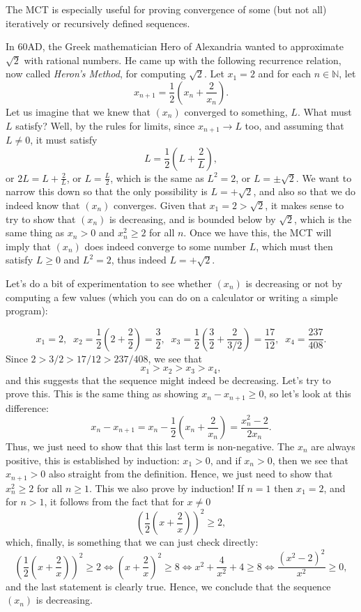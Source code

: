 \documentclass[11pt,dvipsnames]{book}
\numberwithin{figure}{section} %
\numberwithin{table}{section} %
\begin{document}
The MCT is especially useful for proving convergence of some (but not all) iteratively or recursively defined sequences.
\begin{example}
In 60AD, the Greek mathematician Hero of Alexandria wanted to approximate $\sqrt{2}$ with rational numbers. %
He came up with the following recurrence relation, now called {\it Heron's Method}, for computing $\sqrt{2}$. Let $x_{1}=2$ and for each $n\in\mathbb{N}$, let
\[
x_{n+1}=\frac{1}{2}\left(x_{n}+\frac{2}{x_{n}}\right).
\]
Let us imagine that we knew that $(x_n)$ converged to something, $L$. What must $L$ satisfy? Well, by the rules for limits, since $x_{n+1} \to L$ too, and assuming that $L \neq 0$, it must satisfy
\[
L=\frac{1}{2}\left(L+\frac{2}{L}\right),
\]
or $2L =L + \frac{2}{L}$, or $L = \frac{L}{2}$, which is the same as $L^2 = 2$, or $L = \pm\sqrt{2}$. We want to narrow this down so that the only possibility is $L = + \sqrt{2}$, and also so that we do indeed know that $(x_n)$ converges. Given that $x_1 = 2 > \sqrt{2}$, it makes sense to try to show that $(x_n)$ is decreasing, and is bounded below by $\sqrt{2}$, which is the same thing as $x_n > 0$ and $x_n^2 \geq 2$ for all $n$. Once we have this, the MCT will imply that $(x_n)$ does indeed converge to some number $L$, which must then satisfy $L \geq 0$ and $L^2 = 2$, thus indeed $L = + \sqrt{2}$.

Let's do a bit of experimentation to see whether $(x_n)$ is decreasing or not by computing a few values (which you can do on a calculator or writing a simple program):

\[
x_{1}=2,\;\; x_{2} = \frac{1}{2}\left(2+\frac{2}{2}\right) = \frac{3}{2}, \;\; x_{3}=\frac{1}{2}\left(\frac{3}{2}+\frac{2}{3/2}\right) = \frac{17}{12}, \;\; x_{4} = \frac{237}{408}.
\]
Since $ 2 > 3/2 > 17/12 > 237/408$, we see that
\[ x_1 > x_2 > x_3 > x_4, \]
and this suggests that the sequence might indeed be decreasing. Let's try to prove this.
This is the same thing as showing $x_{n}-x_{n+1}\geq 0$, so let's look at this difference:
\[
x_{n}-x_{n+1}=x_{n}-\frac{1}{2}\left(x_{n}+\frac{2}{x_{n}}\right) =\frac{x_{n}^{2}-2}{2x_{n}}.
\]
Thus, we just need to show that this last term is non-negative. The $x_{n}$ are always positive, this is established by induction: $x_1>0$, and if $x_n>0$, then we see that $x_{n+1}>0$ also straight from the definition. Hence, we just need to show that $x_{n}^{2}\geq 2$ for all $n\geq 1$. This we also prove by induction! If $n=1$ then $x_{1}=2$, and for $n>1$, it follows from the fact that for $x \neq 0$
\[
\left(\frac{1}{2}\left(x+\frac{2}{x}\right)\right)^2 \geq 2,
\]
which, finally, is something that we can just check directly:
\[
\left(\frac{1}{2}\left(x+\frac{2}{x}\right)\right)^2 \geq 2 \iff \left(x+\frac{2}{x}\right)^2 \geq 8 \iff x^2 + \frac{4}{x^2} + 4 \geq 8 \iff \frac{(x^2 - 2)^2}{x^2} \geq 0,
\]
and the last statement is clearly true. Hence, we conclude that the sequence $(x_n)$ is decreasing.


\end{example}
\end{document}
